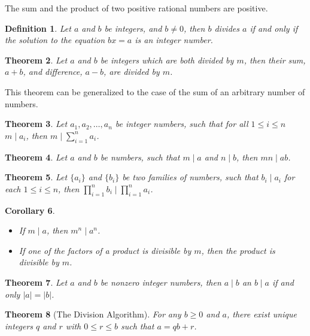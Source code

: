 \documentclass[letterpaper, 10pt]{article}
\newtheorem{thm}{Theorem}[section]
\newtheorem{cor}[thm]{Corollary}
\newtheorem{define}[thm]{Definition}
\newcommand{\set}[1]{\{#1\}}
\newcommand{\divides}{\mid}
\newcommand{\abs}[1]{\left| #1 \right|}
\begin{document}
	The sum and the product of two positive rational numbers are positive.

	\begin{define}
		Let $a$ and $b$ be integers, and $b \neq 0$, then $b$ divides $a$ if and
		only if the solution to the equation $bx = a$ is an integer number.
	\end{define}

	\begin{thm}
		Let $a$ and $b$ be integers which are both divided by $m$, then their
		sum, $a + b$, and difference, $a - b$, are divided by $m$.
	\end{thm}

	This theorem can be generalized to the case of the sum of an arbitrary
	number of numbers.

	\begin{thm}
		Let $a_1,a_2,\ldots,a_n$ be integer numbers, such that for all $1\leq i
		\leq n$ $m \divides a_i$, then $m \divides \sum_{i=1}^n a_i$.
	\end{thm}

	\begin{thm}
		Let $a$ and $b$ be numbers, such that $m \divides a$ and $n \divides b$,
		then $mn \divides ab$.
	\end{thm}
	\begin{thm}
		Let $\set{a_i}$ and $\set{b_i}$ be two families of numbers, such that $b_i
		\divides a_i$ for each $1 \leq i \leq n$, then $\prod_{i=1}^n b_i
		\divides \prod_{i=1}^n a_i$.
	\end{thm}

	\begin{cor}
		\begin{itemize}
			\item If $m \divides a$, then $m^n \divides a^n$.
			\item If one of the factors of a product is divisible by $m$, then
				the product is divisible by $m$.
		\end{itemize}
	\end{cor}

	\begin{thm}
		Let $a$ and $b$ be nonzero integer numbers, then $a \divides b$ an $b
		\divides a$ if and only $\abs{a} = \abs{b}$.
	\end{thm}

	\begin{thm}[The Division Algorithm]
		For any $b \ge 0$ and $a$, there exist unique integers $q$ and $r$ with
		$0 \leq r \le b$ such that $a= qb + r$.
	\end{thm}
\end{document}
